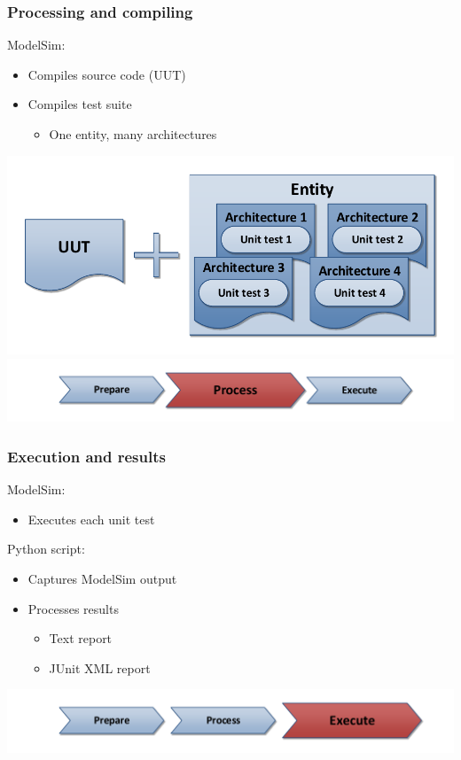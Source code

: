 \documentclass[british,10pt]{beamer}
\begin{document}
\begin{frame}\frametitle{Processing and compiling}
\vskip30pt
ModelSim:
\begin{itemize}
\item Compiles source code (UUT)
\item Compiles test suite
\begin{itemize}
\item[\ding{222}] One entity, many architectures
\end{itemize}
\end{itemize}
\centering
\includegraphics[width=.75\textwidth]{images/sources2.pdf}
\vskip10pt
\includegraphics[width=.7\textwidth]{images/ppe2.pdf}
\end{frame}


\begin{frame}\frametitle{Execution and results}
\vskip48pt
ModelSim:
\begin{itemize}
\item Executes each unit test
\end{itemize}
\vskip5pt
Python script:
\begin{itemize}
\item Captures ModelSim output
\item Processes results
\begin{itemize}
\item Text report
\item JUnit XML report
\end{itemize}
\end{itemize}
\centering
\vskip48pt
\includegraphics[width=.7\textwidth]{images/ppe3.pdf}
\end{frame}
\end{document}
